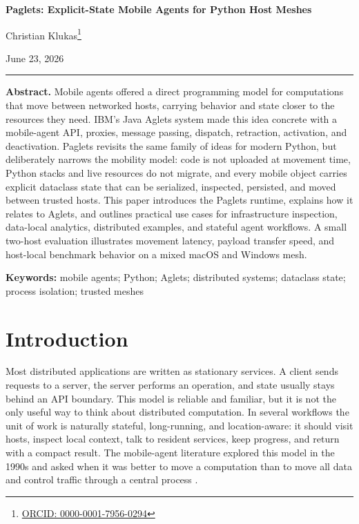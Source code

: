 \documentclass[11pt,a4paper]{article}
\renewenvironment{abstract}
  {\begin{center}\begin{minipage}{0.92\linewidth}\small\noindent\textbf{Abstract.}\quad}
  {\end{minipage}\end{center}\vspace{0.6em}}
\begin{document}
\thispagestyle{plain}
\begin{center}
{\LARGE\bfseries\color{pagletsBlue}Paglets: Explicit-State Mobile Agents for Python Host Meshes\par}
\vspace{0.65em}
{\large Christian Klukas\footnote{\href{https://orcid.org/0000-0001-7956-0294}{ORCID: 0000-0001-7956-0294}}\par}
\vspace{0.25em}
{\small\color{pagletsMuted}June 23, 2026\par}
\vspace{0.9em}
{\color{pagletsRule}\rule{\linewidth}{0.7pt}}
\end{center}
\vspace{0.8em}

\begin{abstract}
Mobile agents offered a direct programming model for computations that move
between networked hosts, carrying behavior and state closer to the resources
they need. IBM's Java Aglets system made this idea concrete with a mobile-agent
API, proxies, message passing, dispatch, retraction, activation, and
deactivation. Paglets revisits the same family of ideas for modern Python, but
deliberately narrows the mobility model: code is not uploaded at movement time,
Python stacks and live resources do not migrate, and every mobile object carries
explicit dataclass state that can be serialized, inspected, persisted, and
moved between trusted hosts. This paper introduces the Paglets
runtime, explains how it relates to Aglets, and outlines practical use cases
for infrastructure inspection, data-local analytics, distributed examples, and
stateful agent workflows. A small two-host evaluation illustrates movement
latency, payload transfer speed, and host-local benchmark behavior on a mixed
macOS and Windows mesh.
\end{abstract}

\noindent\textbf{Keywords:} mobile agents; Python; Aglets; distributed systems;
dataclass state; process isolation; trusted meshes

\section{Introduction}

Most distributed applications are written as stationary services. A client sends
requests to a server, the server performs an operation, and state usually stays
behind an API boundary. This model is reliable and familiar, but it is not the
only useful way to think about distributed computation. In several workflows the
unit of work is naturally stateful, long-running, and location-aware: it should
visit hosts, inspect local context, talk to resident services, keep progress,
and return with a compact result. The mobile-agent literature explored this
model in the 1990s and asked when it was better to move a computation than to
move all data and control traffic through a central process
\cite{harrison1995mobileAgents,lange1997aglets}.
\end{document}
